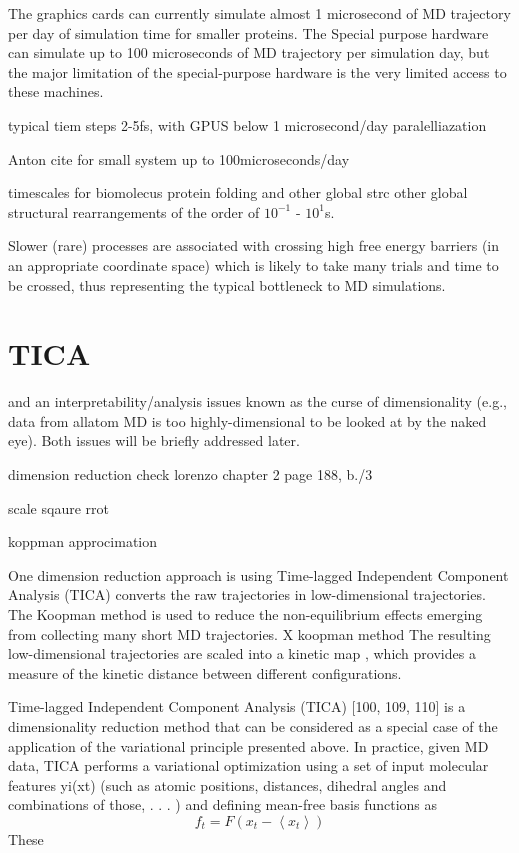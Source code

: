 The graphics cards can currently simulate almost 1 microsecond of MD trajectory per day of simulation time for smaller proteins. The Special purpose hardware can simulate up to 100 microseconds of MD trajectory per simulation day, but the major limitation of the special-purpose hardware is the very limited access to these machines. 




typical tiem steps 2-5fs, with GPUS below 1 microsecond/day paralelliazation

Anton cite for small system up to 100microseconds/day

timescales  
for biomolecus protein folding and other global strc
other global structural rearrangements of the order of
$10^{-1}$ - $10^{1}$s.

Slower (rare) processes are associated with crossing high free energy barriers
(in an appropriate coordinate space) which is likely to take many trials and time to be
crossed, thus representing the typical bottleneck to MD simulations.

\section{TICA}

and an
interpretability/analysis issues known as the curse of dimensionality (e.g., data from allatom
MD is too highly-dimensional to be looked at by the naked eye). Both issues will be
briefly addressed later.


dimension reduction
check  lorenzo chapter 2
page 188, b./3

scale sqaure rrot

koppman approcimation


One dimension reduction approach is using Time-lagged
Independent Component Analysis (TICA) \cite{TICA1-perez2013, TICA2-schwantes2013} converts the raw trajectories in
low-dimensional trajectories. The Koopman method \cite{koopmanold,
koopman2,koopman3,koopman4, wu2017variational, Nueske2017} is used to reduce
the non-equilibrium effects emerging from collecting many short MD trajectories.
X koopman method
 The
resulting low-dimensional trajectories are scaled into a kinetic map
\cite{Noe2015,noe2016commute}, which provides a measure of the kinetic distance
between different configurations. 


Time-lagged Independent Component Analysis (TICA) [100, 109, 110] is a dimensionality
reduction method that can be considered as a special case of the application of the
variational principle presented above. In practice, given MD data, TICA performs a variational
optimization using a set of input molecular features yi(xt) (such as atomic positions,
distances, dihedral angles and combinations of those, . . . ) and defining mean-free basis
functions as
$$f_{t}=F\left(x_{t}-\left\langle x_{t}\right\rangle \right)$$
These

